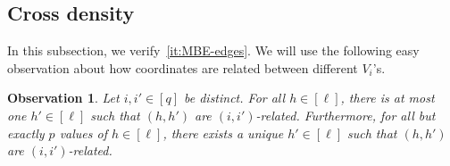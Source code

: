 \documentclass[11pt, a4paper]{article}
\newcommand{\V}[1]{\mathbold{#1}}
\newtheorem{lemma}[theorem]{Lemma}
\newtheorem{observation}[theorem]{Observation}
\theoremstyle{definition}
\newcommand{\cB}{\mathcal{B}}
\begin{document}
%








\subsection{Cross density}
In this subsection, we verify~\ref{it:MBE-edges}. We will use the following easy observation about how coordinates are related between different $V_i$'s.
\begin{observation}\label{obs-relatedcoord}
	Let $i,i'\in [q]$ be distinct. For all $h \in [\ell]$, there is at most one $h' \in [\ell]$ such that $(h,h')$ are $(i,i')$-related. 
	Furthermore, for all but exactly $p$ values of $h\in [\ell]$, there exists a unique $h'\in[\ell]$ such that $(h,h')$ are $(i,i')$-related.
\end{observation}
\end{document}
